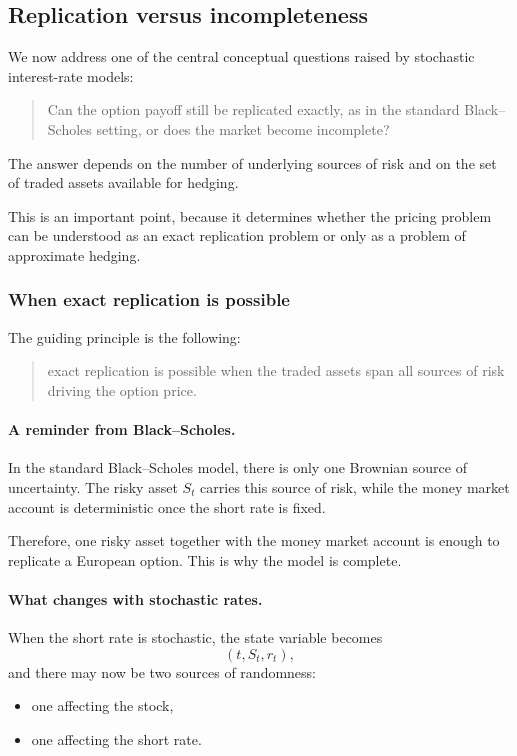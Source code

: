 \documentclass[11pt]{article}
\theoremstyle{plain}
\theoremstyle{definition}
\theoremstyle{remark}
\begin{document}
\subsection{Replication versus incompleteness}

We now address one of the central conceptual questions raised by
stochastic interest-rate models:

\begin{quote}
Can the option payoff still be replicated exactly, as in the standard
Black--Scholes setting, or does the market become incomplete?
\end{quote}

The answer depends on the number of underlying sources of risk and on
the set of traded assets available for hedging.

This is an important point, because it determines whether the pricing
problem can be understood as an exact replication problem or only as a
problem of approximate hedging.

\subsubsection{When exact replication is possible}

The guiding principle is the following:
\begin{quote}
exact replication is possible when the traded assets span all sources of
risk driving the option price.
\end{quote}

\paragraph{A reminder from Black--Scholes.}
In the standard Black--Scholes model, there is only one Brownian source
of uncertainty.
The risky asset \(S_t\) carries this source of risk, while the money
market account is deterministic once the short rate is fixed.

Therefore, one risky asset together with the money market account is
enough to replicate a European option.
This is why the model is complete.

\paragraph{What changes with stochastic rates.}
When the short rate is stochastic, the state variable becomes
\[
(t,S_t,r_t),
\]
and there may now be two sources of randomness:
\begin{itemize}[leftmargin=1.4em]
    \item one affecting the stock,
    \item one affecting the short rate.
\end{itemize}
\end{document}
